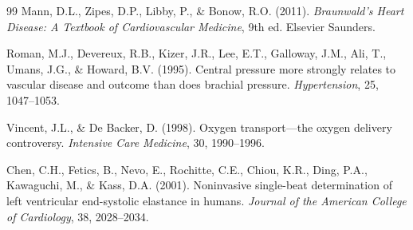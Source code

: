 \documentclass[10pt,twocolumn,a4paper]{article}
\theoremstyle{remark}
\begin{document}
\begin{thebibliography}{99}
Mann, D.L., Zipes, D.P., Libby, P., \& Bonow, R.O. (2011). \textit{Braunwald's Heart Disease: A Textbook of Cardiovascular Medicine}, 9th ed. Elsevier Saunders.

Roman, M.J., Devereux, R.B., Kizer, J.R., Lee, E.T., Galloway, J.M., Ali, T., Umans, J.G., \& Howard, B.V. (1995). Central pressure more strongly relates to vascular disease and outcome than does brachial pressure. \textit{Hypertension}, 25, 1047--1053.

Vincent, J.L., \& De Backer, D. (1998). Oxygen transport—the oxygen delivery controversy. \textit{Intensive Care Medicine}, 30, 1990--1996.

Chen, C.H., Fetics, B., Nevo, E., Rochitte, C.E., Chiou, K.R., Ding, P.A., Kawaguchi, M., \& Kass, D.A. (2001). Noninvasive single-beat determination of left ventricular end-systolic elastance in humans. \textit{Journal of the American College of Cardiology}, 38, 2028--2034.

\end{thebibliography}
\end{document}
